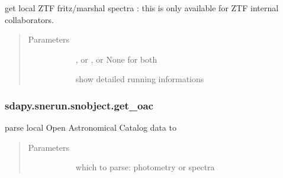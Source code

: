 \documentclass[letterpaper,10pt,english]{sphinxmanual}
\begin{document}
\begin{fulllineitems}
\begin{fulllineitems}
\label{\detokenize{generated/sdapy.snerun.snobject.get_local_spectra:sdapy.snerun.snobject.get_local_spectra}}
get local ZTF fritz/marshal spectra        
: this is only available for ZTF internal collaborators.
\begin{quote}\begin{description}
\item[{Parameters}] \leavevmode\begin{description}
\item[{}] \leavevmode{[}\sphinxtitleref{str}{]}
, or , or None for both

\item[{}] \leavevmode{[}\sphinxtitleref{bool}{]}
show detailed running informations

\end{description}

\end{description}\end{quote}

\end{fulllineitems}



\subsubsection{sdapy.snerun.snobject.get\_oac}
\label{\detokenize{generated/sdapy.snerun.snobject.get_oac:sdapy-snerun-snobject-get-oac}}\label{\detokenize{generated/sdapy.snerun.snobject.get_oac::doc}}

\begin{fulllineitems}
\label{\detokenize{generated/sdapy.snerun.snobject.get_oac:sdapy.snerun.snobject.get_oac}}
parse local Open Astronomical Catalog data to 
\begin{quote}\begin{description}
\item[{Parameters}] \leavevmode\begin{description}
\item[{}] \leavevmode{[}\sphinxtitleref{str}{]}
which to parse: photometry or spectra


\end{description}
\end{description}
\end{quote}
\end{fulllineitems}
\end{fulllineitems}
\end{document}
